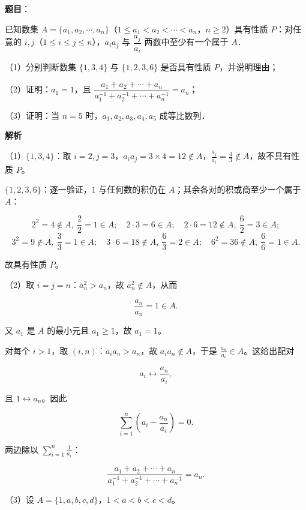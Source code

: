 \begin{answer}

\textbf{题目}：

已知数集 $A=\{a_1,a_2,\cdots,a_n\}$（$1\leqslant a_1<a_2<\cdots<a_n$，$n\geqslant2$）具有性质 $P$：对任意的 $i,j$（$1\leqslant i\leqslant j\leqslant n$），$a_ia_j$ 与 $\dfrac{a_j}{a_i}$ 两数中至少有一个属于 $A$．

（1）分别判断数集 $\{1,3,4\}$ 与 $\{1,2,3,6\}$ 是否具有性质 $P$，并说明理由；

（2）证明：$a_1=1$，且 $\dfrac{a_1+a_2+\cdots+a_n}{a_1^{-1}+a_2^{-1}+\cdots+a_n^{-1}}=a_n$；

（3）证明：当 $n=5$ 时，$a_1,a_2,a_3,a_4,a_5$ 成等比数列．

\textbf{解析}

（1）$\{1,3,4\}$：取 $i=2,j=3$，$a_ia_j=3\times4=12\notin A$，$\frac{a_j}{a_i}=\frac43\notin A$，故不具有性质 $P$。

$\{1,2,3,6\}$：逐一验证，$1$ 与任何数的积仍在 $A$；其余各对的积或商至少一个属于 $A$：

\nopagebreak[4]
\[2^2=4\notin A,\ \frac22=1\in A;\quad 2\cdot3=6\in A;\quad
2\cdot6=12\notin A,\ \frac62=3\in A;\]
\nopagebreak[4]
\[3^2=9\notin A,\ \frac33=1\in A;\quad 3\cdot6=18\notin A,\ \frac63=2\in A;\quad
6^2=36\notin A,\ \frac66=1\in A .\]

故具有性质 $P$。

（2）取 $i=j=n$：$a_n^2>a_n$，故 $a_n^2\notin A$，从而

\nopagebreak[4]
\[\frac{a_n}{a_n}=1\in A .\]

又 $a_1$ 是 $A$ 的最小元且 $a_1\geqslant1$，故 $a_1=1$。

对每个 $i>1$，取 $(i,n)$：$a_ia_n>a_n$，故 $a_ia_n\notin A$，于是 $\frac{a_n}{a_i}\in A$。这给出配对

\nopagebreak[4]
\[a_i\leftrightarrow\frac{a_n}{a_i},\]

且 $1\leftrightarrow a_n$。因此

\nopagebreak[4]
\[\sum_{i=1}^{n}\left(a_i-\frac{a_n}{a_i}\right)=0 .\]

两边除以 $\sum_{i=1}^n\frac1{a_i}$：

\nopagebreak[4]
\[\frac{a_1+a_2+\cdots+a_n}{a_1^{-1}+a_2^{-1}+\cdots+a_n^{-1}}=a_n .\]

（3）设 $A=\{1,a,b,c,d\}$，$1<a<b<c<d$。


\end{answer}
